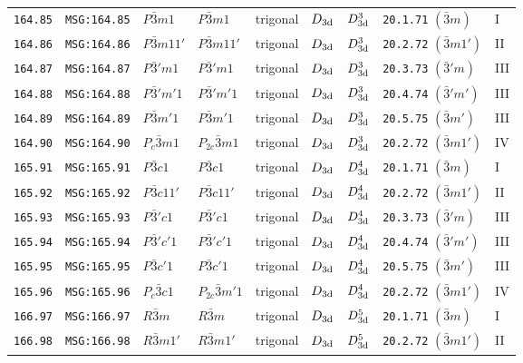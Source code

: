 \documentclass[fleqn,10pt]{jsarticle}
\begin{document}
\begin{center}
\begin{longtable}{lllllllll}
\texttt{164.85} & \texttt{MSG:164.85} & $P\bar{3}m1$ & $P\bar{3}m1$ & trigonal & $D_{\rm 3d}$ & $D_{\rm 3d}^{3}$ & \texttt{20.1.71} $(\bar{3}m)$ & I \\
\texttt{164.86} & \texttt{MSG:164.86} & $P\bar{3}m11'$ & $P\bar{3}m11'$ & trigonal & $D_{\rm 3d}$ & $D_{\rm 3d}^{3}$ & \texttt{20.2.72} $(\bar{3}m1')$ & II \\
\texttt{164.87} & \texttt{MSG:164.87} & $P\bar{3}'m1$ & $P\bar{3}'m1$ & trigonal & $D_{\rm 3d}$ & $D_{\rm 3d}^{3}$ & \texttt{20.3.73} $(\bar{3}'m)$ & III \\
\texttt{164.88} & \texttt{MSG:164.88} & $P\bar{3}'m'1$ & $P\bar{3}'m'1$ & trigonal & $D_{\rm 3d}$ & $D_{\rm 3d}^{3}$ & \texttt{20.4.74} $(\bar{3}'m')$ & III \\
\texttt{164.89} & \texttt{MSG:164.89} & $P\bar{3}m'1$ & $P\bar{3}m'1$ & trigonal & $D_{\rm 3d}$ & $D_{\rm 3d}^{3}$ & \texttt{20.5.75} $(\bar{3}m')$ & III \\
\texttt{164.90} & \texttt{MSG:164.90} & $P_{c}\bar{3}m1$ & $P_{2c}\bar{3}m1$ & trigonal & $D_{\rm 3d}$ & $D_{\rm 3d}^{3}$ & \texttt{20.2.72} $(\bar{3}m1')$ & IV \\ \hline
\texttt{165.91} & \texttt{MSG:165.91} & $P\bar{3}c1$ & $P\bar{3}c1$ & trigonal & $D_{\rm 3d}$ & $D_{\rm 3d}^{4}$ & \texttt{20.1.71} $(\bar{3}m)$ & I \\
\texttt{165.92} & \texttt{MSG:165.92} & $P\bar{3}c11'$ & $P\bar{3}c11'$ & trigonal & $D_{\rm 3d}$ & $D_{\rm 3d}^{4}$ & \texttt{20.2.72} $(\bar{3}m1')$ & II \\
\texttt{165.93} & \texttt{MSG:165.93} & $P\bar{3}'c1$ & $P\bar{3}'c1$ & trigonal & $D_{\rm 3d}$ & $D_{\rm 3d}^{4}$ & \texttt{20.3.73} $(\bar{3}'m)$ & III \\
\texttt{165.94} & \texttt{MSG:165.94} & $P\bar{3}'c'1$ & $P\bar{3}'c'1$ & trigonal & $D_{\rm 3d}$ & $D_{\rm 3d}^{4}$ & \texttt{20.4.74} $(\bar{3}'m')$ & III \\
\texttt{165.95} & \texttt{MSG:165.95} & $P\bar{3}c'1$ & $P\bar{3}c'1$ & trigonal & $D_{\rm 3d}$ & $D_{\rm 3d}^{4}$ & \texttt{20.5.75} $(\bar{3}m')$ & III \\
\texttt{165.96} & \texttt{MSG:165.96} & $P_{c}\bar{3}c1$ & $P_{2c}\bar{3}m'1$ & trigonal & $D_{\rm 3d}$ & $D_{\rm 3d}^{4}$ & \texttt{20.2.72} $(\bar{3}m1')$ & IV \\ \hline
\texttt{166.97} & \texttt{MSG:166.97} & $R\bar{3}m$ & $R\bar{3}m$ & trigonal & $D_{\rm 3d}$ & $D_{\rm 3d}^{5}$ & \texttt{20.1.71} $(\bar{3}m)$ & I \\
\texttt{166.98} & \texttt{MSG:166.98} & $R\bar{3}m1'$ & $R\bar{3}m1'$ & trigonal & $D_{\rm 3d}$ & $D_{\rm 3d}^{5}$ & \texttt{20.2.72} $(\bar{3}m1')$ & II \\

\end{longtable}
\end{center}
\end{document}

